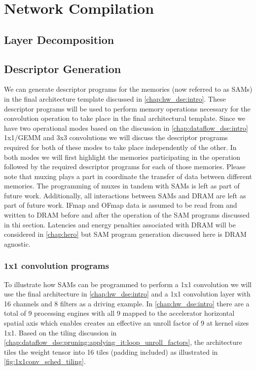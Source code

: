 \chapter{Network Compilation}
\section{Layer Decomposition}

\section{Descriptor Generation}
\label{chap:sams:acc_scheduling}

We can generate descriptor programs for the memories (now referred to as SAMs)
in the final architecture template discussed in \autoref{chap:hw_dse:intro}.
These descriptor programs will be used to perform memory operations necessary
for the convolution operation to take place in the final architectural template.
Since we have two operational modes based on the discussion in
\autoref{chap:dataflow_dse:intro} 1x1/GEMM and 3x3 convolutions we will discuss the
descriptor programs required for both of these modes to take place independently of
the other. In both modes we will first highlight the memories participating in
the operation followed by the required descriptor programs for each of those
memories. Please note that muxing plays a part in coordinate the transfer of
data between different memories. The programming of muxes in tandem with SAMs is
left as part of future work. Additionally, all interactions between SAMs and
DRAM are left as part of future work. IFmap and OFmap data is assumed to be read
from and written to DRAM before and after the operation of the SAM programs
discussed in thi section. Latencies and energy penalties associated with DRAM
will be considered in \autoref{chap:hero} but SAM program generation discussed
here is DRAM agnostic.

\subsection{1x1 convolution programs}
\label{chap:sams:acc_scheduling:1x1}

To illustrate how SAMs can be programmed to perform a 1x1 convolution we will
use the final architecture in \autoref{chap:hw_dse:intro} and a 1x1 convolution
layer with 16 channels and 8 filters as a driving example. In
\autoref{chap:hw_dse:intro} there are a total of 9 processing engines with all 9
mapped to the accelerator horizontal spatial axis which enables creates an
effective an unroll factor of 9 at kernel sizes 1x1. Based on the tiling
discussion in
\autoref{chap:dataflow_dse:pruning:applying_it:loop_unroll_factors}, the
architecture tiles the weight tensor into 16 tiles (padding included) as
illustrated in \autoref{fig:1x1conv_sched_tiling}.


